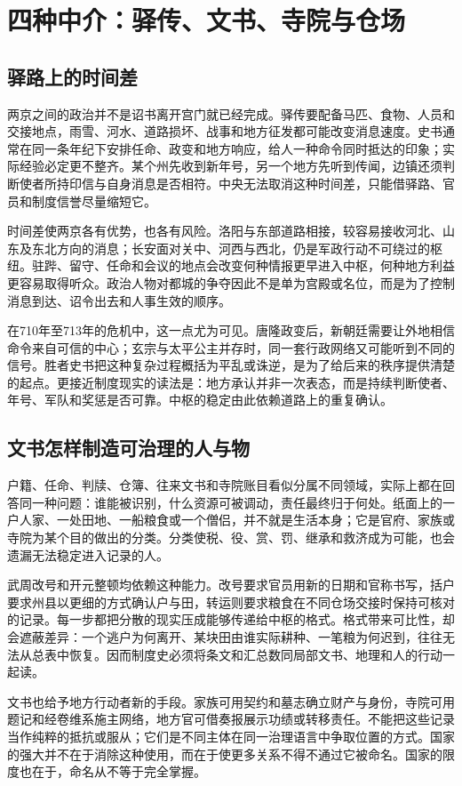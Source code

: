 \section{四种中介：驿传、文书、寺院与仓场}
\subsection{驿路上的时间差}
两京之间的政治并不是诏书离开宫门就已经完成。驿传要配备马匹、食物、人员和交接地点，雨雪、河水、道路损坏、战事和地方征发都可能改变消息速度。史书通常在同一条年纪下安排任命、政变和地方响应，给人一种命令同时抵达的印象；实际经验必定更不整齐。某个州先收到新年号，另一个地方先听到传闻，边镇还须判断使者所持印信与自身消息是否相符。中央无法取消这种时间差，只能借驿路、官员和制度信誉尽量缩短它。

时间差使两京各有优势，也各有风险。洛阳与东部道路相接，较容易接收河北、山东及东北方向的消息；长安面对关中、河西与西北，仍是军政行动不可绕过的枢纽。驻跸、留守、任命和会议的地点会改变何种情报更早进入中枢，何种地方利益更容易取得听众。政治人物对都城的争夺因此不是单为宫殿或名位，而是为了控制消息到达、诏令出去和人事生效的顺序。

在710年至713年的危机中，这一点尤为可见。唐隆政变后，新朝廷需要让外地相信命令来自可信的中心；玄宗与太平公主并存时，同一套行政网络又可能听到不同的信号。胜者史书把这种复杂过程概括为平乱或诛逆，是为了给后来的秩序提供清楚的起点。更接近制度现实的读法是：地方承认并非一次表态，而是持续判断使者、年号、军队和奖惩是否可靠。中枢的稳定由此依赖道路上的重复确认。

\subsection{文书怎样制造可治理的人与物}
户籍、任命、判牍、仓簿、往来文书和寺院账目看似分属不同领域，实际上都在回答同一种问题：谁能被识别，什么资源可被调动，责任最终归于何处。纸面上的一户人家、一处田地、一船粮食或一个僧侣，并不就是生活本身；它是官府、家族或寺院为某个目的做出的分类。分类使税、役、赏、罚、继承和救济成为可能，也会遗漏无法稳定进入记录的人。

武周改号和开元整顿均依赖这种能力。改号要求官员用新的日期和官称书写，括户要求州县以更细的方式确认户与田，转运则要求粮食在不同仓场交接时保持可核对的记录。每一步都把分散的现实压成能够传递给中枢的格式。格式带来可比性，却会遮蔽差异：一个逃户为何离开、某块田由谁实际耕种、一笔粮为何迟到，往往无法从总表中恢复。因而制度史必须将条文和汇总数同局部文书、地理和人的行动一起读。

文书也给予地方行动者新的手段。家族可用契约和墓志确立财产与身份，寺院可用题记和经卷维系施主网络，地方官可借奏报展示功绩或转移责任。不能把这些记录当作纯粹的抵抗或服从；它们是不同主体在同一治理语言中争取位置的方式。国家的强大并不在于消除这种使用，而在于使更多关系不得不通过它被命名。国家的限度也在于，命名从不等于完全掌握。

